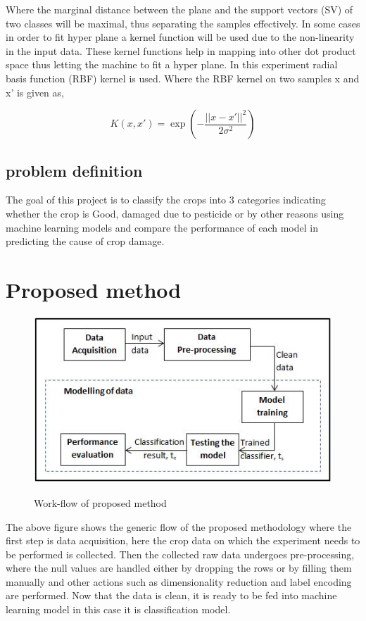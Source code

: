 \documentclass[12pt]{article}
\begin{document}
Where the marginal distance between the plane and the support vectors (SV) of two classes will be maximal, thus separating the samples effectively. In some cases in order to fit hyper plane a kernel function will be used due to the non-linearity in the input data. These kernel functions help in mapping into other dot product space thus letting the machine to fit a hyper plane. In this experiment radial basis function (RBF) kernel is used.  Where the RBF kernel on two samples x and x’ is given as,

\begin{equation} 
 K(x,x')= \exp(-\frac{||x-x'||^2 }{2\sigma^2})  
\end{equation}
	\subsection{problem definition}
The goal of this project is to classify the crops into 3 categories indicating whether the crop is Good, damaged due to pesticide or by other reasons using machine learning models and compare the performance of each model in predicting the cause of crop damage.  
	\clearpage
	
	\section{Proposed method}
	
\begin{figure}[hbt!]
\center
{\includegraphics[scale=1]{method.jpg}}
\caption{Work-flow of proposed method}
\end{figure}	
	The above figure shows the generic flow of the proposed methodology where the first step is data acquisition, here the crop data on which the experiment needs to be performed is collected. Then the collected raw data undergoes pre-processing, where the null values are handled either by dropping the rows or by filling them manually and other actions such as dimensionality reduction and label encoding are performed. Now that the data is clean, it is ready to be fed into machine learning model in this case it is classification model.	
	
\end{document}
